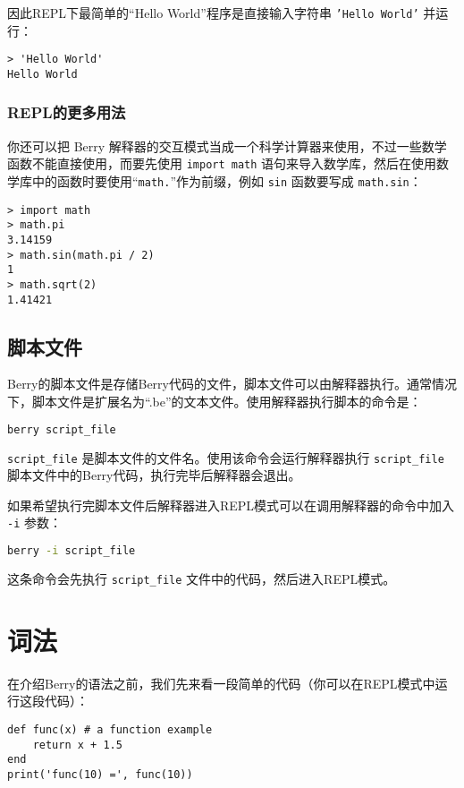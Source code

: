 因此REPL下最简单的``Hello World''程序是直接输入字符串 \texttt{'Hello World'} 并运行：
\begin{lstlisting}[language=berry, numbers=none]
> 'Hello World'
Hello World
\end{lstlisting}

\subsubsection{REPL的更多用法}

你还可以把 Berry 解释器的交互模式当成一个科学计算器来使用，不过一些数学函数不能直接使用，而要先使用 \texttt{import math} 语句来导入数学库，然后在使用数学库中的函数时要使用``\texttt{math.}''作为前缀，例如 \texttt{sin} 函数要写成 \texttt{math.sin}：
\begin{lstlisting}[language=berry, numbers=none]
> import math
> math.pi
3.14159
> math.sin(math.pi / 2)
1
> math.sqrt(2)
1.41421
\end{lstlisting}

\subsection{脚本文件}

Berry的脚本文件是存储Berry代码的文件，脚本文件可以由解释器执行。通常情况下，脚本文件是扩展名为``.be''的文本文件。使用解释器执行脚本的命令是：
\begin{lstlisting}[language=bash, numbers=none]
berry script_file
\end{lstlisting}
\texttt{script\_file} 是脚本文件的文件名。使用该命令会运行解释器执行 \texttt{script\_file} 脚本文件中的Berry代码，执行完毕后解释器会退出。

如果希望执行完脚本文件后解释器进入REPL模式可以在调用解释器的命令中加入 \texttt{-i} 参数：
\begin{lstlisting}[language=bash, numbers=none]
berry -i script_file
\end{lstlisting}
这条命令会先执行 \texttt{script\_file} 文件中的代码，然后进入REPL模式。

\section{词法}

在介绍Berry的语法之前，我们先来看一段简单的代码（你可以在REPL模式中运行这段代码）：
\begin{lstlisting}[language=berry]
def func(x) # a function example
    return x + 1.5
end
print('func(10) =', func(10))
\end{lstlisting}

